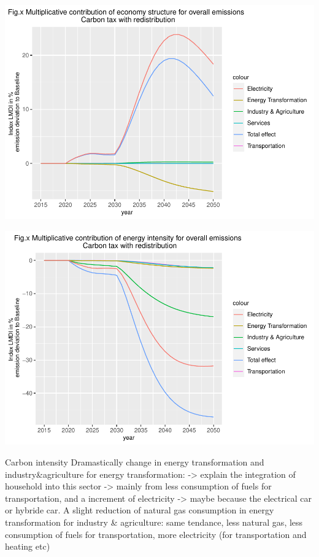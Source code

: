 \documentclass[
]{article}
\begin{document}
\includegraphics{Modele-ThreeMe-Tunisie_Sequeira_Valilou_Wang_files/figure-latex/unnamed-chunk-18-1.pdf}

\includegraphics{Modele-ThreeMe-Tunisie_Sequeira_Valilou_Wang_files/figure-latex/unnamed-chunk-19-1.pdf}

Carbon intensity Dramastically change in energy transformation and
industry\&agriculture for energy transformation: -\textgreater{} explain
the integration of household into this sector -\textgreater{} mainly
from less consumption of fuels for transportation, and a increment of
electricity -\textgreater{} maybe because the electrical car or hybride
car. A slight reduction of natural gas consumption in energy
transformation for industry \& agriculture: same tendance, less natural
gas, less consumption of fuels for transportation, more electricity (for
transportation and heating etc)
\end{document}
